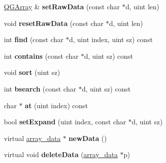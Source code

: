 \begin{DoxyCompactItemize}
\item 
\hypertarget{class_q_g_array_abd848732eb10b82689ebc4624e797737}{\hyperlink{class_q_g_array}{Q\-G\-Array} \& {\bfseries set\-Raw\-Data} (const char $\ast$d, uint len)}\label{class_q_g_array_abd848732eb10b82689ebc4624e797737}

\item 
\hypertarget{class_q_g_array_a8d13692f02cca0568ccae5fc1773d1eb}{void {\bfseries reset\-Raw\-Data} (const char $\ast$d, uint len)}\label{class_q_g_array_a8d13692f02cca0568ccae5fc1773d1eb}

\item 
\hypertarget{class_q_g_array_a2d77f0d0158911d605ac3918503140f5}{int {\bfseries find} (const char $\ast$d, uint index, uint sz) const }\label{class_q_g_array_a2d77f0d0158911d605ac3918503140f5}

\item 
\hypertarget{class_q_g_array_a364b8fde5114a24746f9050b6c34efc6}{int {\bfseries contains} (const char $\ast$d, uint sz) const }\label{class_q_g_array_a364b8fde5114a24746f9050b6c34efc6}

\item 
\hypertarget{class_q_g_array_a153b1b0104af4cb1d7d1512ef65be9ed}{void {\bfseries sort} (uint sz)}\label{class_q_g_array_a153b1b0104af4cb1d7d1512ef65be9ed}

\item 
\hypertarget{class_q_g_array_aec3e40fbae9bfbe4f05f77c81822affa}{int {\bfseries bsearch} (const char $\ast$d, uint sz) const }\label{class_q_g_array_aec3e40fbae9bfbe4f05f77c81822affa}

\item 
\hypertarget{class_q_g_array_ab776210c4b10172de9ca19d60173f54b}{char $\ast$ {\bfseries at} (uint index) const }\label{class_q_g_array_ab776210c4b10172de9ca19d60173f54b}

\item 
\hypertarget{class_q_g_array_a177c9aa0a2a5ba0fe8fe3b5afc167dd1}{bool {\bfseries set\-Expand} (uint index, const char $\ast$d, uint sz)}\label{class_q_g_array_a177c9aa0a2a5ba0fe8fe3b5afc167dd1}

\item 
\hypertarget{class_q_g_array_a341a698397cd2c00908bea0cb15eeb67}{virtual \hyperlink{struct_q_g_array_1_1array__data}{array\-\_\-data} $\ast$ {\bfseries new\-Data} ()}\label{class_q_g_array_a341a698397cd2c00908bea0cb15eeb67}

\item 
\hypertarget{class_q_g_array_abea9f0a2de11b2d7c0a224bc2eba298e}{virtual void {\bfseries delete\-Data} (\hyperlink{struct_q_g_array_1_1array__data}{array\-\_\-data} $\ast$p)}\label{class_q_g_array_abea9f0a2de11b2d7c0a224bc2eba298e}

\end{DoxyCompactItemize}
